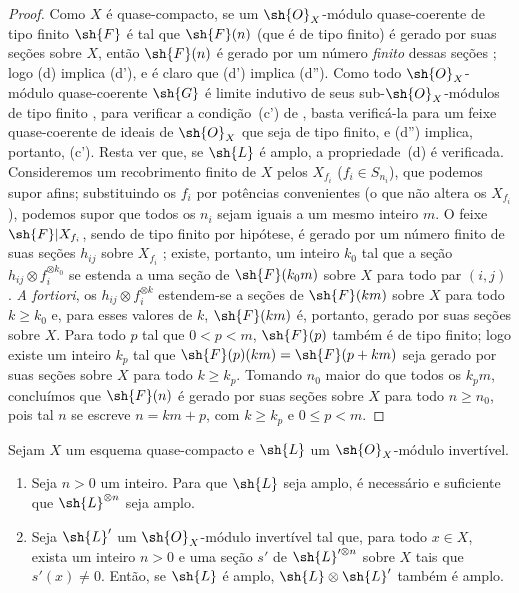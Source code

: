 \documentclass[oneside,10pt]{amsart}
\renewcommand{\leq}{\leqslant}
\renewcommand{\geq}{\geqslant}
\newcommand{\oldpage}[2][]{\marginnote{\normalfont\footnotesize\textbf{#1}~|~#2}\ignorespaces}
\let\EGAOriginalLabel\label
\renewcommand{\label}[1]{\phantomsection\EGAOriginalLabel{#1}}
\begin{document}
\begin{proof}
Como $X$ é quase-compacto, se um $\sh{O}_X$-módulo quase-coerente de tipo finito $\sh{F}$ é tal que $\sh{F}(n)$ (que é de tipo finito) é gerado por suas seções sobre $X$, então $\sh{F}(n)$ é gerado por um número \emph{finito} dessas seções ;
logo (d) implica (d'), e é claro que (d') implica (d'').
Como todo $\sh{O}_X$-módulo quase-coerente $\sh{G}$ é limite indutivo de seus sub-$\sh{O}_X$-módulos de tipo finito , para verificar a condição~(c') de , basta verificá-la para um feixe quase-coerente de ideais de $\sh{O}_X$ que seja de tipo finito, e (d'') implica, portanto, (c').
Resta ver que, se $\sh{L}$ é amplo, a propriedade~(d) é verificada.
Consideremos um recobrimento finito de $X$ pelos $X_{f_i}$ ($f_i\in S_{n_i}$), que podemos supor afins;
substituindo os $f_i$ por potências convenientes (o que não altera os $X_{f_i}$), podemos supor que todos os $n_i$ sejam iguais a um mesmo inteiro $m$.
O feixe $\sh{F}|X_{f_i}$, sendo de tipo finito por hipótese, é gerado por um número finito de suas seções $h_{ij}$ sobre $X_{f_i}$ ;
existe, portanto, um inteiro $k_0$ tal que a seção $h_{ij}\otimes f_i^{\otimes k_0}$ se estenda a uma seção de $\sh{F}(k_0m)$ sobre $X$ para todo par $(i,j)$ .
\emph{A fortiori}, os $h_{ij}\otimes f_i^{\otimes k}$ estendem-se a seções de $\sh{F}(km)$ sobre $X$ para todo $k\geq k_0$ e, para esses valores de $k$, $\sh{F}(km)$ é, portanto, gerado por suas seções sobre $X$.
Para todo $p$ tal que $0<p<m$, $\sh{F}(p)$ também é de tipo finito; logo existe um inteiro $k_p$ tal que $\sh{F}(p)(km)=\sh{F}(p+km)$ seja gerado por suas seções sobre $X$ para todo $k\geq k_p$.
Tomando $n_0$ maior do que todos os $k_pm$, concluímos que $\sh{F}(n)$ é gerado por suas seções sobre $X$ para todo $n\geq n_0$, pois tal $n$ se escreve $n=km+p$, com $k\geq k_p$ e $0\leq p<m$.
\end{proof}

\begin{proposition}[4.5.6]
\label{II.4.5.6}
Sejam $X$ um esquema quase-compacto e $\sh{L}$ um $\sh{O}_X$-módulo invertível.
\begin{enumerate}
  \item[\rm{(i)}] Seja $n>0$ um inteiro. Para que $\sh{L}$ seja amplo, é necessário e suficiente que $\sh{L}^{\otimes n}$ seja amplo.
  \item[\rm{(ii)}] Seja $\sh{L}'$ um $\sh{O}_X$-módulo invertível tal que, para todo $x\in X$, exista um inteiro $n>0$
\oldpage[II]{86}
    e uma seção $s'$ de $\sh{L}'^{\otimes n}$ sobre $X$ tais que $s'(x)\neq0$.
    Então, se $\sh{L}$ é amplo, $\sh{L}\otimes\sh{L}'$ também é amplo.
\end{enumerate}
\end{proposition}
\end{document}
